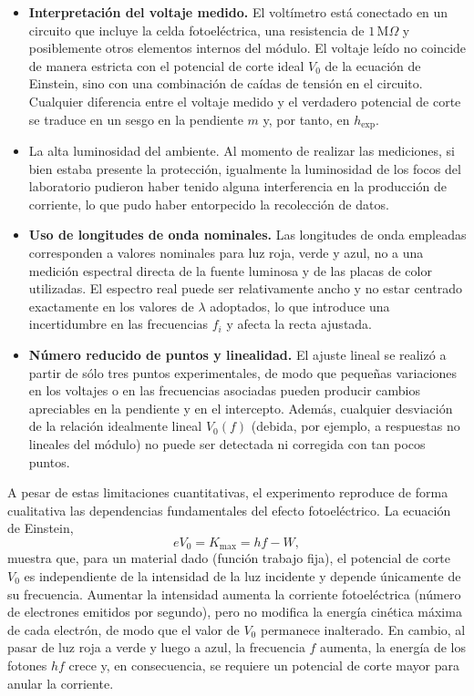 \documentclass[11pt,twocolumn]{article}
\begin{document}
\begin{itemize}
  \item \textbf{Interpretación del voltaje medido.} El voltímetro está
        conectado en un circuito que incluye la celda fotoeléctrica, una
        resistencia de $1\,\text{M}\Omega$ y posiblemente otros elementos
        internos del módulo. El voltaje leído no coincide de manera
        estricta con el potencial de corte ideal $V_0$ de la ecuación de
        Einstein, sino con una combinación de caídas de tensión en el
        circuito. Cualquier diferencia entre el voltaje medido y el
        verdadero potencial de corte se traduce en un sesgo en la
        pendiente $m$ y, por tanto, en $h_{\text{exp}}$.

    \item {La alta luminosidad del ambiente.} Al momento de realizar las mediciones, si bien estaba presente la protección, igualmente la luminosidad de los focos del laboratorio pudieron haber tenido alguna interferencia en la producción de corriente, lo que pudo haber entorpecido la recolección de datos.

  \item \textbf{Uso de longitudes de onda nominales.} Las longitudes de
        onda empleadas corresponden a valores nominales para luz roja,
        verde y azul, no a una medición espectral directa de la fuente
        luminosa y de las placas de color utilizadas. El espectro real
        puede ser relativamente ancho y no estar centrado exactamente en
        los valores de $\lambda$ adoptados, lo que introduce una
        incertidumbre en las frecuencias $f_i$ y afecta la recta ajustada.

  \item \textbf{Número reducido de puntos y linealidad.} El ajuste
        lineal se realizó a partir de sólo tres puntos experimentales,
        de modo que pequeñas variaciones en los voltajes o en las
        frecuencias asociadas pueden producir cambios apreciables en la
        pendiente y en el intercepto. Además, cualquier desviación de la
        relación idealmente lineal $V_0(f)$ (debida, por ejemplo, a
        respuestas no lineales del módulo) no puede ser detectada ni
        corregida con tan pocos puntos.

\end{itemize}

A pesar de estas limitaciones cuantitativas, el experimento reproduce de
forma cualitativa las dependencias fundamentales del efecto
fotoeléctrico. La ecuación de Einstein,
\begin{equation*}
    eV_0 = K_{\max} = hf - W,
\end{equation*}
muestra que, para un material dado (función trabajo fija), el potencial
de corte $V_0$ es independiente de la intensidad de la luz incidente y
depende únicamente de su frecuencia. Aumentar la intensidad aumenta la
corriente fotoeléctrica (número de electrones emitidos por segundo), pero
no modifica la energía cinética máxima de cada electrón, de modo que el
valor de $V_0$ permanece inalterado. En cambio, al pasar de luz roja a
verde y luego a azul, la frecuencia $f$ aumenta, la energía de los
fotones $hf$ crece y, en consecuencia, se requiere un potencial de corte
mayor para anular la corriente.
\end{document}
